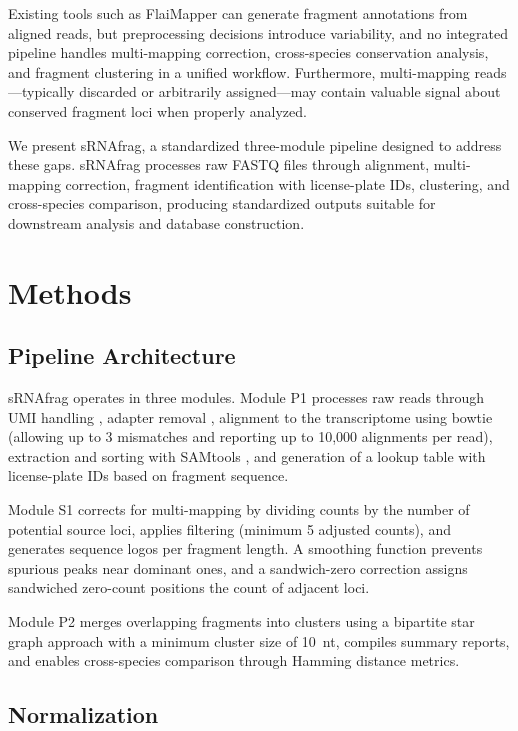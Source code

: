 \documentclass[11pt]{article}
\begin{document}
Existing tools such as FlaiMapper \citep{hoogstrate2015flaimapper} can generate fragment annotations from aligned reads, but preprocessing decisions introduce variability, and no integrated pipeline handles multi-mapping correction, cross-species conservation analysis, and fragment clustering in a unified workflow. Furthermore, multi-mapping reads---typically discarded or arbitrarily assigned---may contain valuable signal about conserved fragment loci when properly analyzed.

We present sRNAfrag, a standardized three-module pipeline designed to address these gaps. sRNAfrag processes raw FASTQ files through alignment, multi-mapping correction, fragment identification with license-plate IDs, clustering, and cross-species comparison, producing standardized outputs suitable for downstream analysis and database construction.

\section{Methods}

\subsection{Pipeline Architecture}

sRNAfrag operates in three modules. Module P1 processes raw reads through UMI handling \citep{smith2014umi}, adapter removal \citep{schubert2016adapterremoval}, alignment to the transcriptome using bowtie \citep{langmead2009bowtie} (allowing up to 3 mismatches and reporting up to 10,000 alignments per read), extraction and sorting with SAMtools \citep{li2009samtools}, and generation of a lookup table with license-plate IDs based on fragment sequence.

Module S1 corrects for multi-mapping by dividing counts by the number of potential source loci, applies filtering (minimum 5 adjusted counts), and generates sequence logos per fragment length. A smoothing function prevents spurious peaks near dominant ones, and a sandwich-zero correction assigns sandwiched zero-count positions the count of adjacent loci.

Module P2 merges overlapping fragments into clusters using a bipartite star graph approach with a minimum cluster size of 10~nt, compiles summary reports, and enables cross-species comparison through Hamming distance metrics.

\subsection{Normalization}
\end{document}

